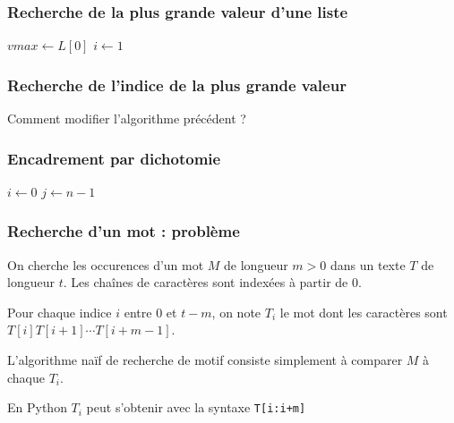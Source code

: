 \begin{frame}
\frametitle{Recherche de la plus grande valeur d'une liste}
\begin{algorithm}[H]
  $vmax\leftarrow L[0]$  \;
  $i \leftarrow 1$\;
  \caption{}
\end{algorithm}  
\end{frame}

\begin{frame}
  \frametitle{Recherche de l'indice de la plus grande valeur}
  Comment modifier l'algorithme précédent ?

\begin{algorithm}[H]
\end{algorithm}  
\end{frame}

\begin{frame}
  \frametitle{Encadrement par dichotomie}
\begin{algorithm}[H]
  $i\leftarrow 0$\;
  $j\leftarrow n-1$\;
  \caption{}
\end{algorithm}
\end{frame}

\begin{frame}
  \frametitle{Recherche d'un mot : problème}
On cherche les occurences d'un mot $M$ de longueur $m>0$ dans un texte $T$ de longueur $t$. Les chaînes de caractères sont indexées à partir de 0.
\bigskip

Pour chaque indice $i$ entre $0$ et $t-m$, on note $T_i$ le mot dont les caractères sont $T[i] T[i+1] \cdots T[i+m-1]$.
\bigskip

L'algorithme naïf de recherche de motif consiste simplement à comparer $M$ à chaque $T_i$.
\bigskip

En Python $T_i$ peut s'obtenir avec la syntaxe \texttt{T[i:i+m]}
\end{frame}

